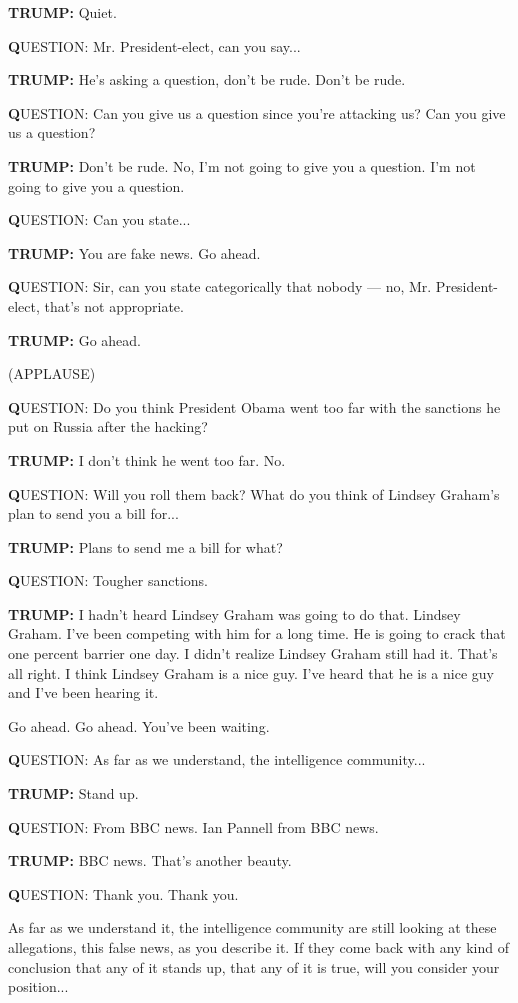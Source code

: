 \textbf{TRUMP:} Quiet.

\textbf{Q}UESTION: Mr. President-elect, can you say...

\textbf{TRUMP:} He's asking a question, don't be rude. Don't be rude.

\textbf{Q}UESTION: Can you give us a question since you're attacking us?
Can you give us a question?

\textbf{TRUMP:} Don't be rude. No, I'm not going to give you a question.
I'm not going to give you a question.

\textbf{Q}UESTION: Can you state...

\textbf{TRUMP:} You are fake news. Go ahead.

\textbf{Q}UESTION: Sir, can you state categorically that nobody --- no,
Mr. President-elect, that's not appropriate.

\textbf{TRUMP:} Go ahead.

(APPLAUSE)

\textbf{Q}UESTION: Do you think President Obama went too far with the
sanctions he put on Russia after the hacking?

\textbf{TRUMP:} I don't think he went too far. No.

\textbf{Q}UESTION: Will you roll them back? What do you think of Lindsey
Graham's plan to send you a bill for...

\textbf{TRUMP:} Plans to send me a bill for what?

\textbf{Q}UESTION: Tougher sanctions.

\textbf{TRUMP:} I hadn't heard Lindsey Graham was going to do that.
Lindsey Graham. I've been competing with him for a long time. He is
going to crack that one percent barrier one day. I didn't realize
Lindsey Graham still had it. That's all right. I think Lindsey Graham is
a nice guy. I've heard that he is a nice guy and I've been hearing it.

Go ahead. Go ahead. You've been waiting.

\textbf{Q}UESTION: As far as we understand, the intelligence
community...

\textbf{TRUMP:} Stand up.

\textbf{Q}UESTION: From BBC news. Ian Pannell from BBC news.

\textbf{TRUMP:} BBC news. That's another beauty.

\textbf{Q}UESTION: Thank you. Thank you.

As far as we understand it, the intelligence community are still looking
at these allegations, this false news, as you describe it. If they come
back with any kind of conclusion that any of it stands up, that any of
it is true, will you consider your position...

